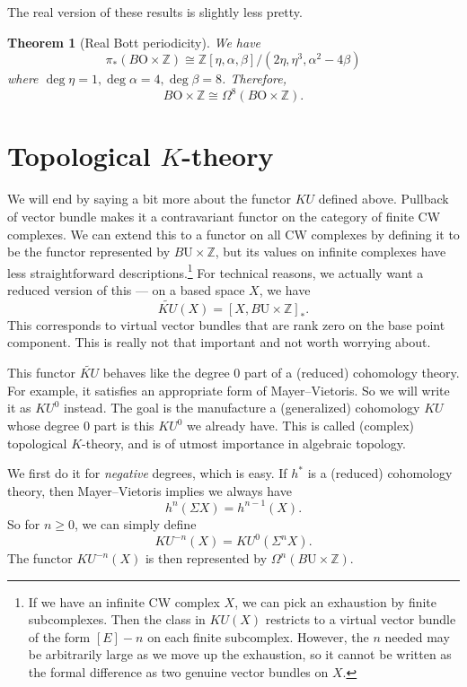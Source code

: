 \documentclass{shortart}
\newtheorem{thm}{Theorem}
\theoremstyle{definition}
\newcommand\BU{B\mathrm{U}}
\newcommand\Z{\mathbb{Z}}
\newcommand\BO{B\mathrm{O}}
\begin{document}
The real version of these results is slightly less pretty.
\begin{thm}[Real Bott periodicity]
  We have
  \[
    \pi_*(\BO \times \Z) \cong \Z[\eta, \alpha, \beta]/(2\eta, \eta^3, \alpha^2 - 4 \beta)
  \]
  where $\deg \eta = 1, \deg \alpha = 4, \deg \beta = 8$. Therefore,
  \[
    \BO \times \Z \cong \Omega^8(\BO \times \Z).
  \]
\end{thm}

\section{Topological \texorpdfstring{$K$}{K}-theory}
We will end by saying a bit more about the functor $KU$ defined above. Pullback of vector bundle makes it a contravariant functor on the category of finite CW complexes. We can extend this to a functor on all CW complexes by defining it to be the functor represented by $\BU \times \Z$, but its values on infinite complexes have less straightforward descriptions.\footnote{If we have an infinite CW complex $X$, we can pick an exhaustion by finite subcomplexes. Then the class in $KU(X)$ restricts to a virtual vector bundle of the form $[E] - n$ on each finite subcomplex. However, the $n$ needed may be arbitrarily large as we move up the exhaustion, so it cannot be written as the formal difference as two genuine vector bundles on $X$.} For technical reasons, we actually want a reduced version of this --- on a based space $X$, we have
\[
  \widetilde{KU}(X) = [X, \BU \times \Z]_*.
\]
This corresponds to virtual vector bundles that are rank zero on the base point component. This is really not that important and not worth worrying about.

This functor $\widetilde{KU}$ behaves like the degree $0$ part of a (reduced) cohomology theory. For example, it satisfies an appropriate form of Mayer--Vietoris. So we will write it as $KU^0$ instead. The goal is the manufacture a (generalized) cohomology $KU$ whose degree $0$ part is this $KU^0$ we already have. This is called (complex) topological $K$-theory, and is of utmost importance in algebraic topology.

We first do it for \emph{negative} degrees, which is easy. If $h^*$ is a (reduced) cohomology theory, then Mayer--Vietoris implies we always have
\[
  h^n(\Sigma X) = h^{n - 1}(X).
\]
So for $n \geq 0$, we can simply define
\[
  KU^{-n}(X) = KU^0(\Sigma^n X).
\]
The functor $KU^{-n}(X)$ is then represented by $\Omega^n (\BU \times \Z)$.
\end{document}
